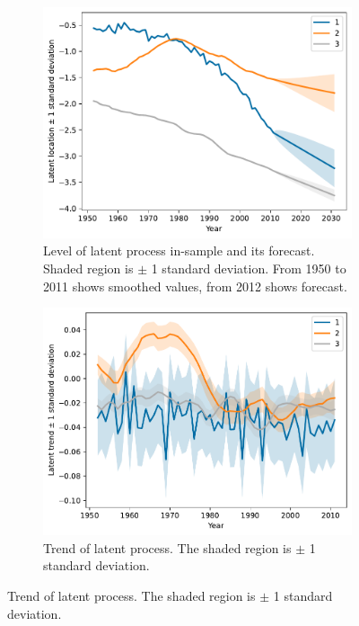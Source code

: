 \documentclass[preprint,12pt]{elsarticle}
\begin{document}
\begin{figure}
    \centering    \begin{subfigure}[b]{0.45\textwidth}
        \centering
        \includegraphics[width=\textwidth]{figs/sweden_1952_2011_Male_100_1_3latent_forecast.pdf}
        \caption{Level of latent process in-sample and its forecast. Shaded region is $\pm$ 1 standard deviation. From 1950 to 2011 shows smoothed values, from 2012 shows forecast.}
    \end{subfigure}
    \hfill
    \begin{subfigure}[b]{0.45\textwidth}
        \centering
        \includegraphics[width=\textwidth]{figs/sweden_1952_2011_Male_100_1_3latent_trend.pdf}
        \caption{Trend of latent process. The shaded region is $\pm$ 1 standard deviation.}

\end{subfigure}
\end{figure}
\end{document}

